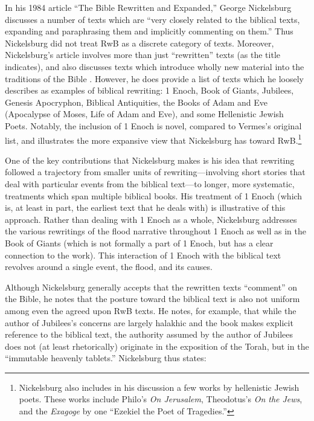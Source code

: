 In his 1984 article ``The Bible Rewritten and Expanded,'' George
Nickelsburg discusses a number of texts which are ``very closely related
to the biblical texts, expanding and paraphrasing them and implicitly
commenting on them.''\autocite[89]{nickelsburg_stone1984} Thus
Nickelsburg did not treat RwB as a discrete category of texts. Moreover,
Nickelsburg's article involves more than just ``rewritten'' texts (as
the title indicates), and also discusses texts which introduce wholly
new material into the traditions of the Bible
\autocite[89--90]{nickelsburg_stone1984}. However, he does provide a
list of texts which he loosely describes as examples of biblical
rewriting: 1 Enoch, Book of Giants, Jubilees, Genesis Apocryphon,
Biblical Antiquities, the Books of Adam and Eve (Apocalypse of Moses,
Life of Adam and Eve), and some Hellenistic Jewish Poets. Notably, the
inclusion of 1 Enoch is novel, compared to Vermes's original list, and
illustrates the more expansive view that Nickelsburg has toward
RwB.\footnote{Nickelsburg also includes in his discussion a few works by
  hellenistic Jewish poets. These works include Philo's \emph{On
  Jerusalem}, Theodotus's \emph{On the Jews}, and the \emph{Exagoge} by
  one ``Ezekiel the Poet of Tragedies.''}

One of the key contributions that Nickelsburg makes is his idea that
rewriting followed a trajectory from smaller units of
rewriting---involving short stories that deal with particular events
from the biblical text---to longer, more systematic, treatments which
span multiple biblical books. His treatment of 1 Enoch (which is, at
least in part, the earliest text that he deals with) is illustrative of
this approach. Rather than dealing with 1 Enoch as a whole, Nickelsburg
addresses the various rewritings of the flood narrative throughout 1
Enoch as well as in the Book of Giants (which is not formally a part of
1 Enoch, but has a clear connection to the work). This interaction of 1
Enoch with the biblical text revolves around a single event, the flood,
and its causes.

Although Nickelsburg generally accepts that the rewritten texts
``comment'' on the Bible, he notes that the posture toward the biblical
text is also not uniform among even the agreed upon RwB texts. He notes,
for example, that while the author of Jubilees's concerns are largely
halakhic and the book makes explicit reference to the biblical text, the
authority assumed by the author of Jubilees does not (at least
rhetorically) originate in the exposition of the Torah, but in the
``immutable heavenly
tablets.''\autocite[100--101]{nickelsburg_stone1984} Nickelsburg thus
states:

